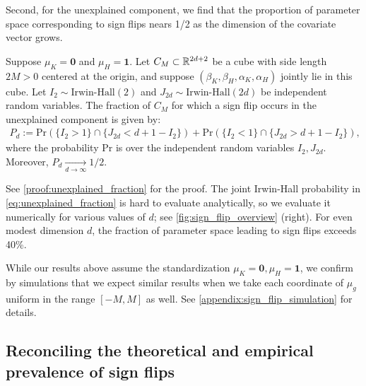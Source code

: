 Second, for the unexplained component, we find that the proportion of parameter space corresponding to sign flips nears 1/2 as the dimension of the covariate vector grows.
\begin{proposition} 
\label{prop:unexplained_fraction}
	Suppose $\mu_K = \mathbf{0}$ and $\mu_H = \mathbf{1}$.
	Let $C_M \subset \mathbb{R}^{2d+2}$ be a cube with side length $2M > 0$ centered at the origin, and suppose $(\beta_K, \beta_H, \alpha_K, \alpha_H)$ jointly lie in this cube.
	Let \( I_2 \sim \text{Irwin-Hall}(2) \) and \( J_{2d} \sim \text{Irwin-Hall}(2d) \) be independent random variables.
	The fraction of $C_M$ for which a sign flip occurs in the unexplained component is given by:
\begin{align} \label{eq:unexplained_fraction}
    P_d := \mathrm{Pr} \left( \{ I_2 > 1 \} \cap \{ J_{2d} < d + 1 - I_2 \}  \right) + \mathrm{Pr} \left( \{ I_2 < 1 \} \cap \{ J_{2d} > d + 1 - I_2 \} \right),
\end{align}
where the probability $\mathrm{Pr}$ is over the independent random variables $I_2, J_{2d}$.
Moreover, $P_d \underset{d \to \infty}{\longrightarrow} 1/2$.
\end{proposition}
See \cref{proof:unexplained_fraction} for the proof.
The joint Irwin-Hall probability in \cref{eq:unexplained_fraction} is hard to evaluate analytically, so we evaluate it numerically for various values of $d$; see \cref{fig:sign_flip_overview} (right).
For even modest dimension $d$, the fraction of parameter space leading to sign flips exceeds 40\%.

While our results above assume the standardization $\mu_K=\mathbf{0}, \mu_H=\mathbf{1}$, 
we confirm by simulations that we expect similar results when we take each coordinate of $\mu_g$ uniform
in the range $[-M,M]$ as well. See \cref{appendix:sign_flip_simulation} for details.

\subsection{Reconciling the theoretical and empirical prevalence of sign flips}
\label{sec:reconciling_theory_empirics}

